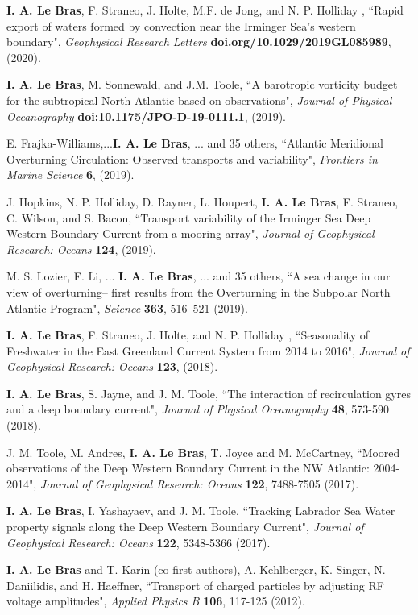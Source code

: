 \documentclass[paper=letter,fontsize=11pt]{scrartcl} %
\newcommand{\PaperEntry}[6]{
		\noindent #1, ``#2", \textit{#3} \textbf{#4}, #5 (#6).}
\begin{document}
\begin{etaremune}

\item \PaperEntry{\textbf{I. A. Le Bras}, F. Straneo, J. Holte, M.F. de Jong, and N. P. Holliday }{Rapid export of waters formed by convection near the Irminger Sea's western boundary}{Geophysical Research Letters}{doi.org/10.1029/2019GL085989}{}{2020}

\item \PaperEntry{\textbf{I. A. Le Bras}, M. Sonnewald, and J.M. Toole}{A barotropic vorticity budget for the subtropical North Atlantic based on observations}{Journal of Physical Oceanography}{doi:10.1175/JPO-D-19-0111.1}{}{2019}

\item \PaperEntry{E. Frajka-Williams,...\textbf{I. A. Le Bras}, ... and 35 others}{Atlantic Meridional Overturning Circulation: Observed transports and variability}{Frontiers in Marine Science}{6}{}{2019}

\item \PaperEntry{J. Hopkins, N. P. Holliday, D. Rayner, L. Houpert, \textbf{I. A. Le Bras}, F. Straneo, C. Wilson, and S. Bacon}{Transport variability of the Irminger Sea Deep Western Boundary Current from a mooring array}{Journal of Geophysical Research: Oceans}{124}{}{2019}


\item \PaperEntry{M. S. Lozier, F.  Li, ... \textbf{I. A. Le Bras}, ... and 35 others}{A sea change in our view of overturning– first results from the
Overturning in the Subpolar North Atlantic Program}{Science}{363}{516--521}{2019}


\item \PaperEntry{\textbf{I. A. Le Bras}, F. Straneo, J. Holte, and N. P. Holliday }{Seasonality of Freshwater in the East Greenland Current
System from 2014 to 2016}{Journal of Geophysical Research: Oceans}{123}{}{2018}

\item \PaperEntry{\textbf{I. A. Le Bras}, S. Jayne, and J. M. Toole}{The interaction of recirculation gyres and a deep boundary current}{Journal of Physical Oceanography}{48}{573-590}{2018}
	
\item \PaperEntry{J. M. Toole, M. Andres, \textbf{I. A. Le Bras}, T. Joyce and M. McCartney}{Moored observations of the Deep Western Boundary Current in the NW Atlantic: 2004-2014}{ Journal of Geophysical Research: Oceans}{122}{7488-7505}{2017}

\item \PaperEntry{\textbf{I. A. Le Bras}, I. Yashayaev, and J. M. Toole}{Tracking Labrador Sea Water property signals along the Deep Western Boundary Current}{ Journal of Geophysical Research: Oceans}{122}{5348-5366}{2017}

\item \PaperEntry{\textbf{I. A. Le Bras} and T. Karin (co-first authors), A. Kehlberger, K. Singer, N. Daniilidis, and H. Haeffner}{Transport of charged particles by adjusting RF voltage amplitudes}{Applied Physics B}{106}{117-125}{2012}

\end{etaremune}
\end{document}
